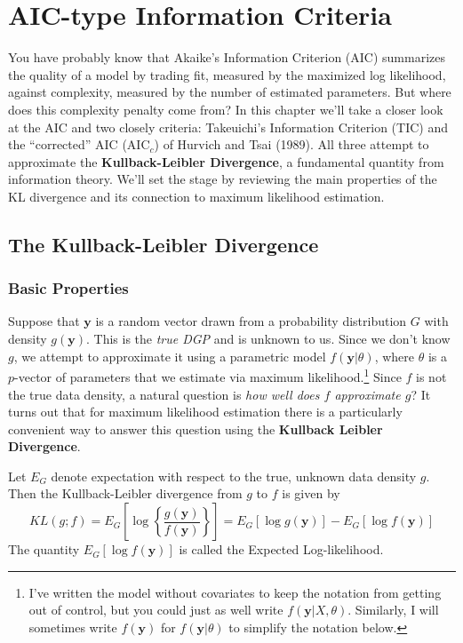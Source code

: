 \chapter{AIC-type Information Criteria}
You have probably know that Akaike's Information Criterion (AIC) summarizes the quality of a model by trading fit, measured by the maximized log likelihood, against complexity, measured by the number of estimated parameters.
But where does this complexity penalty come from?
In this chapter we'll take a closer look at the AIC and two closely criteria: Takeuichi's Information Criterion (TIC) and the ``corrected'' AIC (AIC$_c$) of Hurvich and Tsai (1989).
All three attempt to approximate the \textbf{Kullback-Leibler Divergence}, a fundamental quantity from information theory.
We'll set the stage by reviewing the main properties of the KL divergence and its connection to maximum likelihood estimation.


\section{The Kullback-Leibler Divergence}

\subsection{Basic Properties}
Suppose that $\mathbf{y}$ is a random vector drawn from a probability distribution $G$ with density $g(\mathbf{y})$. This is the \emph{true DGP} and is unknown to us. Since we don't know $g$, we attempt to approximate it using a parametric model $f(\mathbf{y}|\theta)$, where $\theta$ is a $p$-vector of parameters that we estimate via maximum likelihood.\footnote{I've written the model without covariates to keep the notation from getting out of control, but you could just as well write $f(\mathbf{y}|X,\theta)$. Similarly, I will sometimes write $f(\mathbf{y})$ for $f(\mathbf{y}|\theta)$ to simplify the notation below. } Since $f$ is not the true data density, a natural question is \emph{how well does $f$ approximate $g$}? It turns out that for maximum likelihood estimation there is a particularly convenient way to answer this question using the \textbf{Kullback Leibler Divergence}.


\begin{defn}[KL Divergence]
Let $E_G$ denote expectation with respect to the true, unknown data density $g$. Then the Kullback-Leibler divergence from $g$ to $f$ is given by
$$KL(g;f) = E_G \left[ \log{\left\{\frac{g(\textbf{y})}{f(\textbf{y})}\right\}}\right]= E_G\left[ \log{g(\textbf{y})}\right] - E_G\left[ \log{f(\textbf{y})} \right]$$
The quantity $E_G\left[ \log{f(\mathbf{y})} \right]$ is called the Expected Log-likelihood.
\end{defn}

